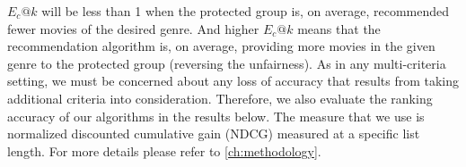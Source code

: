 

$E_c@k$ will be less than 1 when the protected group is, on average, recommended fewer movies of the desired genre. And higher $E_c@k$ means that the recommendation algorithm is, on average, providing more movies in the given genre to the protected group (reversing the unfairness). As in any multi-criteria setting, we must be concerned about any loss of accuracy that results from taking additional criteria into consideration. Therefore, we also evaluate the ranking accuracy of our algorithms in the results below. The measure that we use is normalized discounted cumulative gain (NDCG) measured at a specific list length. For more details please refer to \ref{ch:methodology}.







